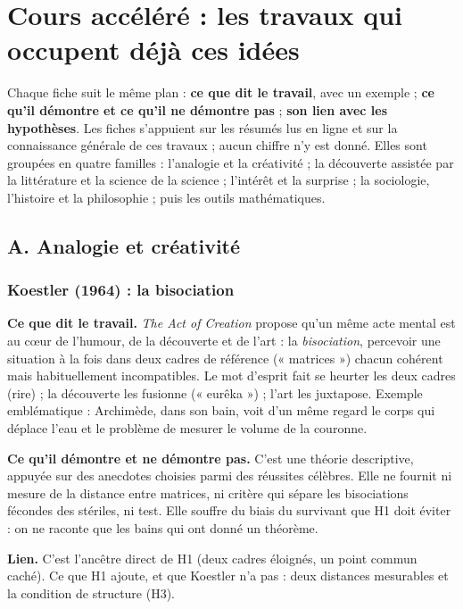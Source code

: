 \documentclass[a4paper,11pt]{article}
\newcommand{\cours}[1]{\par\smallskip\textbf{\textsf{#1}}\enspace}
\begin{document}
\section{Cours accéléré : les travaux qui occupent déjà ces idées}
Chaque fiche suit le même plan : \textbf{ce que dit le travail}, avec un exemple ; \textbf{ce qu'il démontre et ce qu'il ne démontre pas} ; \textbf{son lien avec les hypothèses}. Les fiches s'appuient sur les résumés lus en ligne et sur la connaissance générale de ces travaux ; aucun chiffre n'y est donné. Elles sont groupées en quatre familles : l'analogie et la créativité ; la découverte assistée par la littérature et la science de la science ; l'intérêt et la surprise ; la sociologie, l'histoire et la philosophie ; puis les outils mathématiques.

\subsection*{A. Analogie et créativité}

\subsubsection{Koestler (1964) : la bisociation}
\cours{Ce que dit le travail.} \emph{The Act of Creation} propose qu'un même acte mental est au cœur de l'humour, de la découverte et de l'art : la \emph{bisociation}, percevoir une situation à la fois dans deux cadres de référence (« matrices ») chacun cohérent mais habituellement incompatibles. Le mot d'esprit fait se heurter les deux cadres (rire) ; la découverte les fusionne (« eurêka ») ; l'art les juxtapose. Exemple emblématique : Archimède, dans son bain, voit d'un même regard le corps qui déplace l'eau et le problème de mesurer le volume de la couronne.
\cours{Ce qu'il démontre et ne démontre pas.} C'est une théorie descriptive, appuyée sur des anecdotes choisies parmi des réussites célèbres. Elle ne fournit ni mesure de la distance entre matrices, ni critère qui sépare les bisociations fécondes des stériles, ni test. Elle souffre du biais du survivant que H1 doit éviter : on ne raconte que les bains qui ont donné un théorème.
\cours{Lien.} C'est l'ancêtre direct de H1 (deux cadres éloignés, un point commun caché). Ce que H1 ajoute, et que Koestler n'a pas : deux distances mesurables et la condition de structure (H3).
\end{document}
